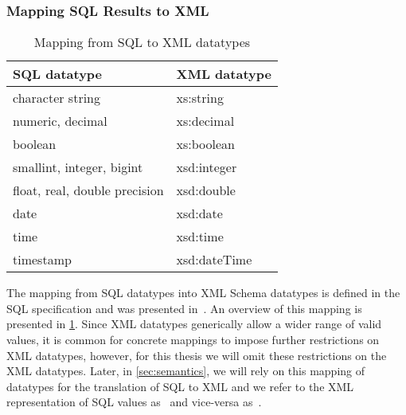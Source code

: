 \subsubsection{Mapping SQL Results to XML}
\label{sec:mapping-xml-types}
%
\begin{table}[t]\centering
  \caption{Mapping from SQL to XML datatypes}
  \label{fig:SQL2XML}
  { \scriptsize
    \begin{tabular}{l|l}
      \toprule
      \textbf{SQL datatype} & \textbf{XML datatype}\\
      \midrule
      character string & xs:string\\
      numeric, decimal& xs:decimal\\
      boolean & xs:boolean \\
      smallint, integer, bigint & xsd:integer\\
      float, real, double precision & xsd:double\\
      date & xsd:date\\
      time & xsd:time\\
      timestamp & xsd:dateTime\\
      \bottomrule
    \end{tabular}
  }
\end{table}
%
The mapping from SQL datatypes into \ac{XML} Schema datatypes is defined in the \ac{SQL} specification and was presented
in~\citet{EisenbergMelton:2001aa}.  
%
An overview of this mapping is presented in \cref{fig:SQL2XML}.
%
Since \ac{XML} datatypes generically allow a wider range of valid values, it is common for concrete mappings to impose
further restrictions on \ac{XML} datatypes, however, for this thesis we will omit these restrictions on the \ac{XML}
datatypes.
%
Later, in \cref{sec:semantics}, we will rely on this mapping of datatypes for the translation of \ac{SQL} to \ac{XML}
and we refer to the \ac{XML} representation of \ac{SQL} values as~ and vice-versa
as~.
%




